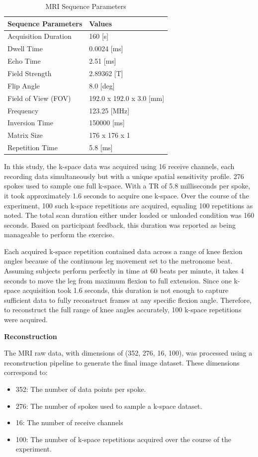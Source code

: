 \documentclass{micro-econ-thesis}
\begin{document}
\begin{table}[H]
	\centering
	
	\caption{MRI Sequence Parameters}
	\label{tab:mri_seq_params}
	\begin{tabular}{@{}ll@{}}
		\toprule
		Sequence Parameters & Values \\ \midrule
		Acquisition Duration & 160 [s] \\
		Dwell Time & 0.0024 [ms] \\
		Echo Time & 2.51 [ms] \\
		Field Strength & 2.89362 [T] \\
		Flip Angle & 8.0 [deg] \\
		Field of View (FOV) & 192.0 x 192.0 x 3.0 [mm] \\
		Frequency & 123.25 [MHz] \\
		Inversion Time & 150000 [ms] \\
		Matrix Size & 176 x 176 x 1 \\
		Repetition Time & 5.8 [ms] \\
		\bottomrule
	\end{tabular}
\end{table}

In this study, the k-space data was acquired using 16 receive channels, each recording data simultaneously but with a unique spatial sensitivity profile. 276 spokes used to sample one full k-space. With a TR of 5.8 milliseconds per spoke, it took approximately 1.6 seconds to acquire one k-space. Over the course of the experiment, 100 such k-space repetitions are acquired, equaling 100 repetitions as noted. The total scan duration either under loaded or unloaded condition was 160 seconds. Based on participant feedback, this duration was reported as being manageable to perform the exercise. 

Each acquired k-space repetition contained data across a range of knee flexion angles because of the continuous leg movement set to the metronome beat. Assuming subjects perform perfectly in time at 60 beats per minute, it takes 4 seconds to move the leg from maximum flexion to full extension. Since one k-space acquisition took 1.6 seconds, this duration is not enough to capture sufficient data to fully reconstruct frames at any specific flexion angle. Therefore, to reconstruct the full range of knee angles accurately,  100 k-space repetitions were acquired. 
    
\textbf{Reconstruction}

The MRI raw data, with dimensions of (352, 276, 16, 100), was processed using a reconstruction pipeline to generate the final image dataset. These dimensions correspond to: 
\begin{itemize}
	\item 352: The number of data points per spoke.
	\item 276: The number of spokes used to sample a k-space dataset.
	\item 16: The number of receive channels
	\item 100: The number of k-space repetitions acquired over the course of the experiment.
\end{itemize}
\end{document}
